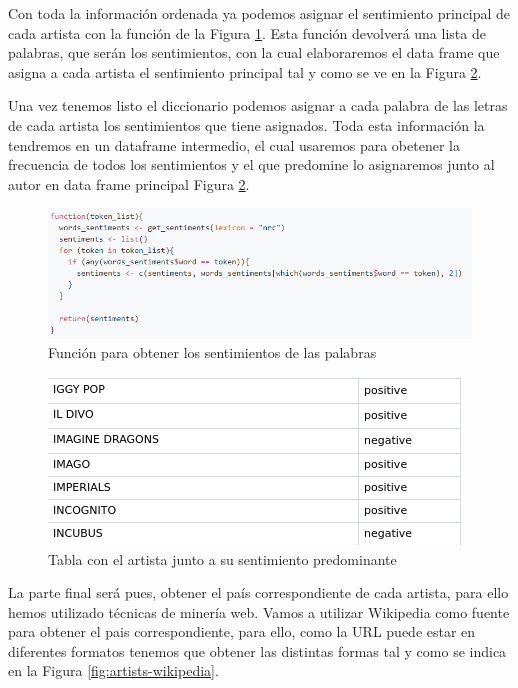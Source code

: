 Con toda la información ordenada ya podemos asignar el sentimiento principal de cada artista con la función de la Figura \ref{fig:lista-sentimientos}. Esta función devolverá una lista de palabras, que serán los sentimientos, con la cual elaboraremos el data frame que asigna a cada artista el sentimiento principal tal y como se ve en la Figura \ref{fig:artista-sentimiento}.

Una vez tenemos listo el diccionario podemos asignar a cada palabra de las letras de cada artista los sentimientos que tiene asignados. Toda esta información la tendremos en un dataframe intermedio, el cual usaremos para obetener la frecuencia de todos los sentimientos y el que predomine lo asignaremos junto al autor en data frame principal Figura \ref{fig:artista-sentimiento}.

\begin{figure}[h]
	\centering
	\includegraphics[width=\linewidth]{Imagenes/lista-sentimientos}
	\caption{Función para obtener los sentimientos de las palabras}
	\label{fig:lista-sentimientos}
\end{figure}

\begin{figure}[h]
	\centering
	\includegraphics[width=0.7\linewidth]{Imagenes/artista-sentimiento}
	\caption{Tabla con el artista junto a su sentimiento predominante}
	\label{fig:artista-sentimiento}
\end{figure}


La parte final será pues, obtener el país correspondiente de cada artista, para ello hemos utilizado técnicas de minería web. Vamos a utilizar Wikipedia como fuente para obtener el pais correspondiente, para ello, como la URL puede estar en diferentes formatos tenemos que obtener las distintas formas tal y como se indica en la Figura \ref{fig:artists-wikipedia}. 

